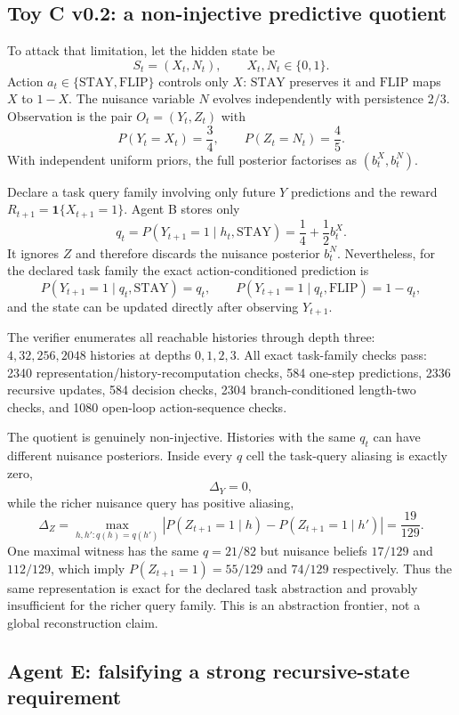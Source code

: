 \documentclass[10pt]{article}
\begin{document}
\subsection{Toy C v0.2: a non-injective predictive quotient}

To attack that limitation, let the hidden state be
\[
S_t=(X_t,N_t),\qquad X_t,N_t\in\{0,1\}.
\]
Action $a_t\in\{\mathrm{STAY},\mathrm{FLIP}\}$ controls only $X$: $\mathrm{STAY}$ preserves it and $\mathrm{FLIP}$ maps $X$ to $1-X$. The nuisance variable $N$ evolves independently with persistence $2/3$. Observation is the pair $O_t=(Y_t,Z_t)$ with
\[
P(Y_t=X_t)=\frac34,
\qquad
P(Z_t=N_t)=\frac45.
\]
With independent uniform priors, the full posterior factorises as $(b_t^X,b_t^N)$.

Declare a task query family involving only future $Y$ predictions and the reward $R_{t+1}=\mathbf 1\{X_{t+1}=1\}$. Agent B stores only
\[
q_t=P(Y_{t+1}=1\mid h_t,\mathrm{STAY})
=\frac14+\frac12 b_t^X.
\]
It ignores $Z$ and therefore discards the nuisance posterior $b_t^N$. Nevertheless, for the declared task family the exact action-conditioned prediction is
\[
P(Y_{t+1}=1\mid q_t,\mathrm{STAY})=q_t,
\qquad
P(Y_{t+1}=1\mid q_t,\mathrm{FLIP})=1-q_t,
\]
and the state can be updated directly after observing $Y_{t+1}$.

The verifier enumerates all reachable histories through depth three: $4,32,256,2048$ histories at depths $0,1,2,3$. All exact task-family checks pass: 2340 representation/history-recomputation checks, 584 one-step predictions, 2336 recursive updates, 584 decision checks, 2304 branch-conditioned length-two checks, and 1080 open-loop action-sequence checks.

The quotient is genuinely non-injective. Histories with the same $q_t$ can have different nuisance posteriors. Inside every $q$ cell the task-query aliasing is exactly zero,
\[
\Delta_Y=0,
\]
while the richer nuisance query has positive aliasing,
\[
\Delta_Z
=\max_{h,h':q(h)=q(h')}
\left|P(Z_{t+1}=1\mid h)-P(Z_{t+1}=1\mid h')\right|
=\frac{19}{129}.
\]
One maximal witness has the same $q=21/82$ but nuisance beliefs $17/129$ and $112/129$, which imply $P(Z_{t+1}=1)=55/129$ and $74/129$ respectively. Thus the same representation is exact for the declared task abstraction and provably insufficient for the richer query family. This is an abstraction frontier, not a global reconstruction claim.

\subsection{Agent E: falsifying a strong recursive-state requirement}
\end{document}
